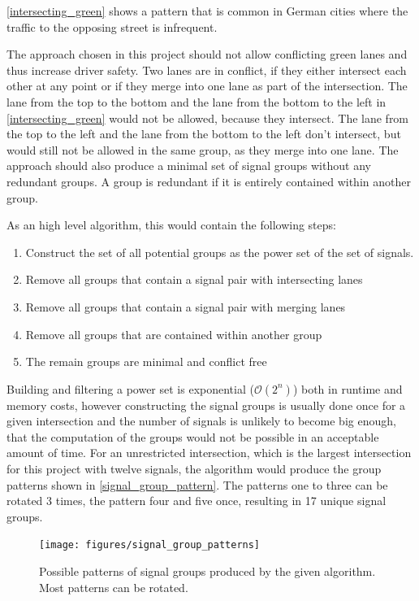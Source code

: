 \autoref{intersecting_green} shows a pattern that is common in German cities where the traffic to the opposing street is infrequent.

The approach chosen in this project should not allow conflicting green lanes and thus increase driver safety. Two lanes are in conflict, if they either intersect each other at any point or if they merge into one lane as part of the intersection. The lane from the top to the bottom and the lane from the bottom to the left in \autoref{intersecting_green} would not be allowed, because they intersect. The lane from the top to the left and the lane from the bottom to the left don't intersect, but would still not be allowed in the same group, as they merge into one lane. The approach should also produce a minimal set of signal groups without any redundant groups. A group is redundant if it is entirely contained within another group.

As an high level algorithm, this would contain the following steps:

\begin{enumerate}
	\item Construct the set of all potential groups as the power set of the set of signals.
	\item Remove all groups that contain a signal pair with intersecting lanes
	\item Remove all groups that contain a signal pair with merging lanes
	\item Remove all groups that are contained within another group
	\item The remain groups are minimal and conflict free
\end{enumerate}

Building and filtering a power set is exponential ($\mathcal{O}(2^n)$) both in runtime and memory costs, however constructing the signal groups is usually done once for a given intersection and the number of signals is unlikely to become big enough, that the computation of the groups would not be possible in an acceptable amount of time. For an unrestricted intersection, which is the largest intersection for this project with twelve signals, the algorithm would produce the group patterns shown in \autoref{signal_group_pattern}. The patterns one to three can be rotated 3 times, the pattern four and five once, resulting in 17 unique signal groups.

\begin{figure}[ht!]
	\centering
	\texttt{[image: figures/signal\_group\_patterns]}
	\caption{Possible patterns of signal groups produced by the given algorithm. Most patterns can be rotated.}
	\label{signal_group_pattern}
\end{figure}

